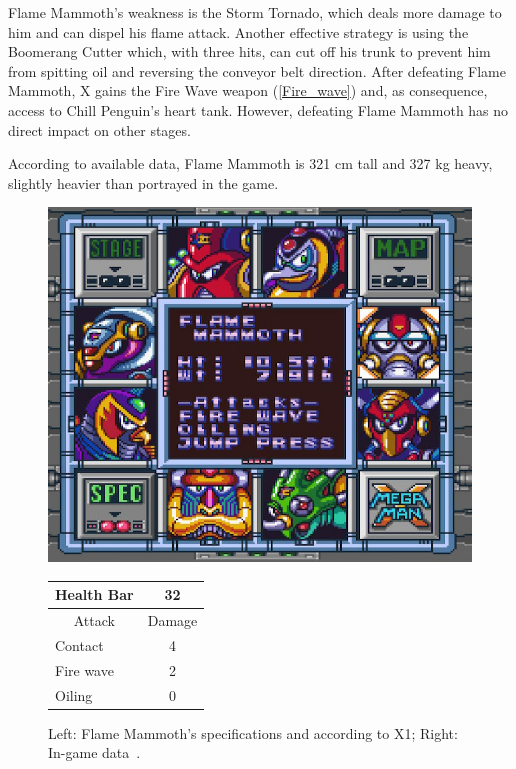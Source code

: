 Flame Mammoth's weakness is the Storm Tornado, which deals more damage to him and can dispel his flame attack. Another effective strategy is using the Boomerang Cutter which, with three hits, can cut off his trunk to prevent him from spitting oil and reversing the conveyor belt direction. After defeating Flame Mammoth, X gains the Fire Wave weapon (\ref{Fire_wave}) and, as consequence, access to Chill Penguin's heart tank. However, defeating Flame Mammoth has no direct impact on other stages.

According to available data, Flame Mammoth is 321 cm tall and 327 kg heavy, slightly heavier than portrayed in the game.

\begin{figure}[htp]
	\begin{minipage}[c]{0.45\linewidth}
		\vspace{0pt}
		\centering
		\includegraphics[width=\linewidth]{figures/X1/Flame_mammoth/Flame_mammoth_specs.jpg}
	\end{minipage}
	\begin{minipage}[c]{0.45\linewidth}
		\centering
		\vspace{0pt}
		\begin{tabular}[h]{l c}
			\toprule
			Health Bar & 32\\
			\midrule
			\multicolumn{1}{c}{Attack} & \multicolumn{1}{c}{Damage}\\
			Contact & 4\\
			Fire wave& 2\\
			Oiling & 0\\
			\bottomrule
		\end{tabular}
	\end{minipage}
	\caption{Left: Flame Mammoth's specifications and according to X1; Right: In-game data~\cite{wiki:Flame_mammoth}. }
	\label{Mammoth_specs}
\end{figure}


